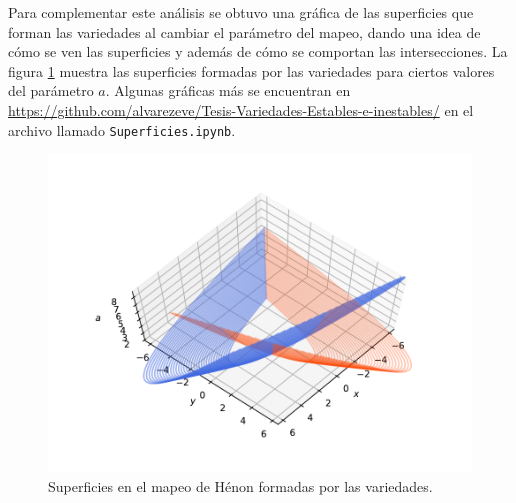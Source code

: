 Para complementar este análisis se obtuvo una gráfica de las superficies que forman las variedades al cambiar el parámetro del mapeo, dando una idea de cómo se ven las superficies y además de cómo se comportan las intersecciones. La figura \ref{SuperficiesH} muestra las superficies formadas por las variedades para ciertos valores del parámetro $a$. Algunas gráficas más se encuentran en  \url{https://github.com/alvarezeve/Tesis-Variedades-Estables-e-inestables/} en el archivo llamado \texttt{Superficies.ipynb}.
\begin{figure}[H]
\centering
\includegraphics[scale=0.9]{HenonV}
\caption{Superficies en el mapeo de Hénon formadas por las variedades.}
\label{SuperficiesH}
\end{figure}



